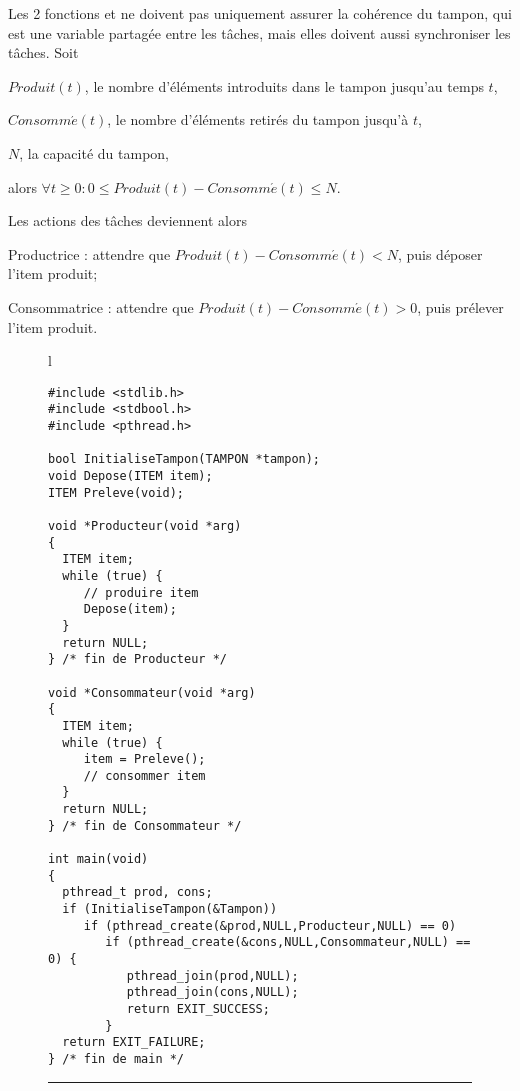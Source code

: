 Les 2 fonctions  et  ne doivent pas uniquement assurer la cohérence du tampon, qui est une variable partagée entre les tâches, mais elles doivent aussi synchroniser les tâches. Soit

\hspace{0.6cm}$Produit(t)$, le nombre d'éléments introduits dans le tampon jusqu'au temps $t$,

\hspace{0.6cm}$Consomm\acute{e}(t)$, le nombre d'éléments retirés du tampon jusqu'à $t$,

\hspace{0.6cm}$N$, la capacité du tampon,

alors $\forall t \geq 0: 0 \leq Produit(t) - Consomm\acute{e}(t) \leq N$.

Les actions des tâches deviennent alors

\hspace{0.6cm}Productrice : attendre que $Produit(t) - Consomm\acute{e}(t) < N$, puis déposer l'item produit;

\hspace{0.6cm}Consommatrice : attendre que $Produit(t) - Consomm\acute{e}(t) > 0$, puis prélever l'item produit.

\begin{figure}[t]
\begin{center}
\begin{tabular}{l}
\lstset{language=C++}
\begin{lstlisting}
#include <stdlib.h>
#include <stdbool.h>
#include <pthread.h>

bool InitialiseTampon(TAMPON *tampon);
void Depose(ITEM item);
ITEM Preleve(void);

void *Producteur(void *arg)
{
  ITEM item;
  while (true) {
     // produire item
     Depose(item);
  }
  return NULL;
} /* fin de Producteur */

void *Consommateur(void *arg)
{
  ITEM item;
  while (true) {
     item = Preleve();
     // consommer item
  }
  return NULL;
} /* fin de Consommateur */

int main(void)
{
  pthread_t prod, cons;
  if (InitialiseTampon(&Tampon))
     if (pthread_create(&prod,NULL,Producteur,NULL) == 0)
        if (pthread_create(&cons,NULL,Consommateur,NULL) == 0) {
           pthread_join(prod,NULL);
           pthread_join(cons,NULL);
           return EXIT_SUCCESS;
        }
  return EXIT_FAILURE;
} /* fin de main */
\end{lstlisting}
\end{tabular}
\end{center}
\vspace{-.2cm}
\rule{\textwidth}{0.01in}
\end{figure}

